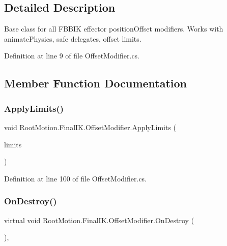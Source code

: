 \subsection{Detailed Description}
Base class for all F\+B\+B\+IK effector position\+Offset modifiers. Works with animate\+Physics, safe delegates, offset limits. 



Definition at line 9 of file Offset\+Modifier.\+cs.



\subsection{Member Function Documentation}
\mbox{\label{class_root_motion_1_1_final_i_k_1_1_offset_modifier_a5c61c7f0be864ad1a3bcc371feec1f53}} 
\subsubsection{\texorpdfstring{Apply\+Limits()}{ApplyLimits()}}
{\footnotesize\ttfamily void Root\+Motion.\+Final\+I\+K.\+Offset\+Modifier.\+Apply\+Limits (\begin{DoxyParamCaption}\item[{\mbox{\hyperlink{class_root_motion_1_1_final_i_k_1_1_offset_modifier_1_1_offset_limits}{Offset\+Limits}} \mbox{[}$\,$\mbox{]}}]{limits }\end{DoxyParamCaption})\hspace{0.3cm}{\ttfamily [protected]}}



Definition at line 100 of file Offset\+Modifier.\+cs.

\mbox{\label{class_root_motion_1_1_final_i_k_1_1_offset_modifier_ac407dea9830e075f9ea4511ba4811d69}} 
\subsubsection{\texorpdfstring{On\+Destroy()}{OnDestroy()}}
{\footnotesize\ttfamily virtual void Root\+Motion.\+Final\+I\+K.\+Offset\+Modifier.\+On\+Destroy (\begin{DoxyParamCaption}{ }\end{DoxyParamCaption})\hspace{0.3cm}{\ttfamily [protected]}, {\ttfamily [virtual]}}



